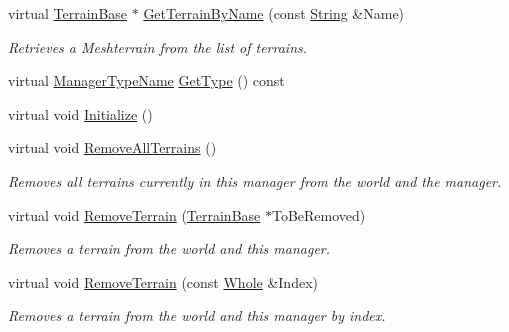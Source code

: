 \begin{DoxyCompactItemize}
virtual \hyperlink{classMezzanine_1_1TerrainBase}{TerrainBase} $\ast$ \hyperlink{classMezzanine_1_1TerrainManager_aa582965012dc57bd39b01d6dc8773642}{GetTerrainByName} (const \hyperlink{namespaceMezzanine_acf9fcc130e6ebf08e3d8491aebcf1c86}{String} \&Name)
\begin{DoxyCompactList}\small\item\em Retrieves a Meshterrain from the list of terrains. \item\end{DoxyCompactList}\item 
virtual \hyperlink{classMezzanine_1_1ManagerBase_a08cecf5169cad3e82be81a3a159b0b6e}{ManagerTypeName} \hyperlink{classMezzanine_1_1TerrainManager_a86fbb914cfbc0de3dc555d670bb35107}{GetType} () const 
\item 
virtual void \hyperlink{classMezzanine_1_1TerrainManager_abe9550c9c6565bbd0610dcaa20eedc0c}{Initialize} ()
\item 
virtual void \hyperlink{classMezzanine_1_1TerrainManager_ae940f33a369e54c2322de4202d236eb2}{RemoveAllTerrains} ()
\begin{DoxyCompactList}\small\item\em Removes all terrains currently in this manager from the world and the manager. \item\end{DoxyCompactList}\item 
virtual void \hyperlink{classMezzanine_1_1TerrainManager_ae304121e1f5023bb76cfda962d860395}{RemoveTerrain} (\hyperlink{classMezzanine_1_1TerrainBase}{TerrainBase} $\ast$ToBeRemoved)
\begin{DoxyCompactList}\small\item\em Removes a terrain from the world and this manager. \item\end{DoxyCompactList}\item 
virtual void \hyperlink{classMezzanine_1_1TerrainManager_abd5fec432a277253d08c5c7a462f3cd6}{RemoveTerrain} (const \hyperlink{namespaceMezzanine_adcbb6ce6d1eb4379d109e51171e2e493}{Whole} \&Index)
\begin{DoxyCompactList}\small\item\em Removes a terrain from the world and this manager by index. \item\end{DoxyCompactList}\end{DoxyCompactItemize}
